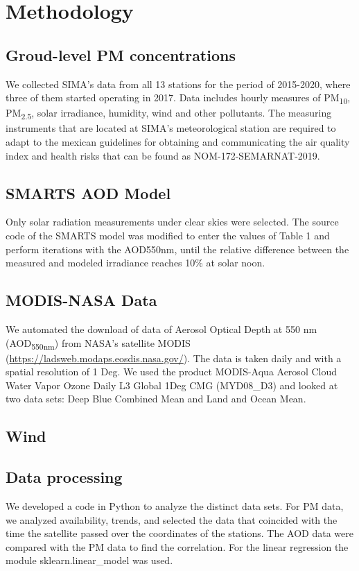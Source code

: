 \section{Methodology}
\subsection{Groud-level PM concentrations}
We collected SIMA’s data from all 13 stations for the period of 2015-2020, where three of them
started operating in 2017. Data includes hourly measures of PM\textsubscript{10}, PM\textsubscript{2.5},
solar irradiance, humidity, wind and other pollutants. The measuring instruments that are located at SIMA’s
meteorological station are required to adapt to the mexican guidelines for obtaining and communicating the
air quality index and health risks that can be found as NOM-172-SEMARNAT-2019.
\subsection{SMARTS AOD Model}
Only solar radiation measurements under clear skies were selected. The source code of the SMARTS model was
modified to enter the values of Table 1 and perform iterations with the AOD550nm, until the relative difference
between the measured and modeled irradiance reaches 10\% at solar noon.
\subsection{MODIS-NASA Data}
We automated the download of data of Aerosol Optical Depth at 550 nm (AOD\textsubscript{550nm}) from NASA’s
satellite MODIS (\url{https://ladsweb.modaps.eosdis.nasa.gov/}). The data is taken daily and with a spatial
resolution of 1 Deg. We used the product MODIS-Aqua Aerosol Cloud Water Vapor Ozone Daily L3 Global 1Deg CMG
(MYD08\_D3) and looked at two data sets: Deep Blue Combined Mean and Land and Ocean Mean. 
\subsection{Wind}
\subsection{Data processing}
We developed a code in Python to analyze the distinct data sets. For PM data, we analyzed availability,
trends, and selected the data that coincided with the time the satellite passed over the coordinates of
the stations. The AOD data were compared with the PM data to find the correlation. For the linear regression
the module sklearn.linear\_model was used.